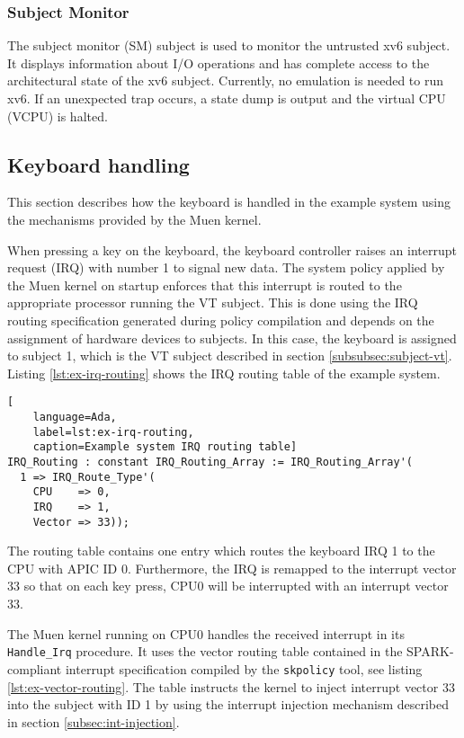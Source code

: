 \subsubsection{Subject Monitor}
The subject monitor (SM) subject is used to monitor the untrusted xv6
subject. It displays information about I/O operations and has complete access to
the architectural state of the xv6 subject. Currently, no emulation is needed to
run xv6. If an unexpected trap occurs, a state dump is output and the virtual
CPU (VCPU) is halted.

\subsection{Keyboard handling}\label{subsec:keyboard-handling}
This section describes how the keyboard is handled in the example system using
the mechanisms provided by the Muen kernel.

When pressing a key on the keyboard, the keyboard controller raises an interrupt
request (IRQ) with number 1 to signal new data. The system policy
applied by the Muen kernel on startup enforces that this interrupt is routed to
the appropriate processor running the VT subject. This is done using the IRQ
routing specification generated during policy compilation and depends on the
assignment of hardware devices to subjects. In this case, the keyboard is
assigned to subject 1, which is the VT subject described in section
\ref{subsubsec:subject-vt}. Listing \ref{lst:ex-irq-routing} shows the IRQ
routing table of the example system.

\begin{lstlisting}[
	language=Ada,
	label=lst:ex-irq-routing,
	caption=Example system IRQ routing table]
IRQ_Routing : constant IRQ_Routing_Array := IRQ_Routing_Array'(
  1 => IRQ_Route_Type'(
    CPU    => 0,
    IRQ    => 1,
    Vector => 33));
\end{lstlisting}

The routing table contains one entry which routes the keyboard IRQ 1 to the CPU
with APIC ID 0. Furthermore, the IRQ is remapped to the interrupt vector 33 so
that on each key press, CPU0 will be interrupted with an interrupt vector 33.

The Muen kernel running on CPU0 handles the received interrupt in its
\texttt{Handle\_Irq} procedure. It uses the vector routing table contained in
the SPARK-compliant interrupt specification compiled by the \texttt{skpolicy}
tool, see listing \ref{lst:ex-vector-routing}. The table instructs the kernel to
inject interrupt vector 33 into the subject with ID 1 by using the interrupt
injection mechanism described in section \ref{subsec:int-injection}.

